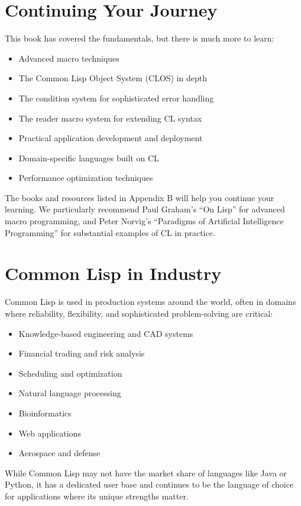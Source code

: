 \section*{Continuing Your Journey}

This book has covered the fundamentals, but there is much more to learn:

\begin{itemize}
\item Advanced macro techniques
\item The Common Lisp Object System (CLOS) in depth
\item The condition system for sophisticated error handling
\item The reader macro system for extending CL syntax
\item Practical application development and deployment
\item Domain-specific languages built on CL
\item Performance optimization techniques
\end{itemize}

The books and resources listed in Appendix B will help you continue your learning. We
particularly recommend Paul Graham's ``On Lisp'' for advanced macro programming, and
Peter Norvig's ``Paradigms of Artificial Intelligence Programming'' for substantial examples
of CL in practice.

\section*{Common Lisp in Industry}

Common Lisp is used in production systems around the world, often in domains where
reliability, flexibility, and sophisticated problem-solving are critical:

\begin{itemize}
\item Knowledge-based engineering and CAD systems
\item Financial trading and risk analysis
\item Scheduling and optimization
\item Natural language processing
\item Bioinformatics
\item Web applications
\item Aerospace and defense
\end{itemize}

While Common Lisp may not have the market share of languages like Java or Python, it
has a dedicated user base and continues to be the language of choice for applications where
its unique strengths matter.

